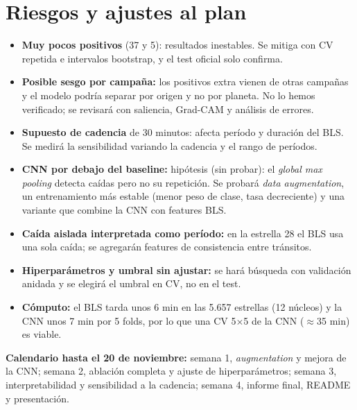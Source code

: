 \documentclass[11pt,a4paper]{article}
\begin{document}
\section{Riesgos y ajustes al plan}\label{sec:riesgos}

\begin{itemize}
  \item \textbf{Muy pocos positivos} (37 y 5): resultados inestables. Se
  mitiga con CV repetida e intervalos bootstrap, y el test oficial solo
  confirma.
  \item \textbf{Posible sesgo por campaña:} los positivos extra vienen de otras
  campañas y el modelo podría separar por origen y no por planeta. No lo hemos
  verificado; se revisará con saliencia, Grad-CAM y análisis de errores.
  \item \textbf{Supuesto de cadencia} de 30 minutos: afecta período y
  duración del BLS. Se medirá la sensibilidad variando la cadencia y el rango
  de períodos.
  \item \textbf{CNN por debajo del baseline:} hipótesis (sin probar): el
  \emph{global max pooling} detecta caídas pero no su repetición. Se probará
  \emph{data augmentation}, un entrenamiento más estable (menor peso de clase,
  tasa decreciente) y una variante que combine la CNN con features BLS.
  \item \textbf{Caída aislada interpretada como período:} en la estrella 28 el
  BLS usa una sola caída; se agregarán features de consistencia entre tránsitos.
  \item \textbf{Hiperparámetros y umbral sin ajustar:} se hará búsqueda con
  validación anidada y se elegirá el umbral en CV, no en el test.
  \item \textbf{Cómputo:} el BLS tarda unos 6 min en las 5.657 estrellas (12
  núcleos) y la CNN unos 7 min por 5 folds, por lo que una CV 5$\times$5
  de la CNN ($\approx$35 min) es viable.
\end{itemize}
\textbf{Calendario hasta el 20 de noviembre:} semana 1, \emph{augmentation} y
mejora de la CNN; semana 2, ablación completa y ajuste de hiperparámetros;
semana 3, interpretabilidad y sensibilidad a la cadencia; semana 4, informe
final, README y presentación.

\begingroup
\small


\endgroup
\end{document}

